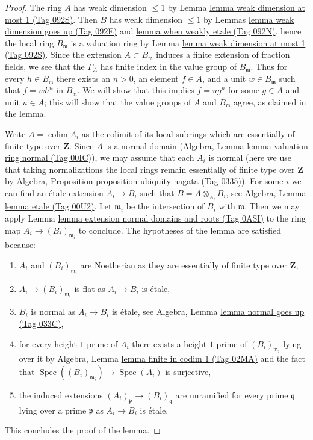 \documentclass{amsart}
\theoremstyle{plain}
\theoremstyle{definition}
\theoremstyle{remark}
\numberwithin{equation}{subsection}
\def\colim{\mathop{\mathrm{colim}}\nolimits}
\def\Spec{\mathop{\mathrm{Spec}}}
\begin{document}
\begin{proof}
The ring $A$ has weak dimension $\leq 1$ by
Lemma \href{https://stacks.math.columbia.edu/tag/092S}{lemma weak dimension at most 1 (Tag 092S)}. Then $B$ has weak dimension
$\leq 1$ by Lemmas \href{https://stacks.math.columbia.edu/tag/092E}{lemma weak dimension goes up (Tag 092E)} and
\href{https://stacks.math.columbia.edu/tag/092N}{lemma when weakly etale (Tag 092N)}. hence the local ring $B_\mathfrak m$
is a valuation ring by Lemma \href{https://stacks.math.columbia.edu/tag/092S}{lemma weak dimension at most 1 (Tag 092S)}.
Since the extension $A \subset B_\mathfrak m$ induces a finite
extension of fraction fields,
we see that the $\Gamma_A$ has finite index in the value group of
$B_{\mathfrak m}$. Thus for every $h \in B_\mathfrak m$ there exists
an $n > 0$, an element $f \in A$, and a unit $w \in B_\mathfrak m$
such that $f = w h^n$ in $B_\mathfrak m$. We will show that this implies
$f = ug^n$ for some $g \in A$ and unit $u \in A$; this will show that
the value groups of $A$ and $B_\mathfrak m$ agree, as claimed in the lemma.

\medskip\noindent
Write $A = \colim A_i$ as the colimit of its local subrings which
are essentially of finite type over $\mathbf{Z}$. Since $A$
is a normal domain (Algebra, Lemma \href{https://stacks.math.columbia.edu/tag/00IC}{lemma valuation ring normal (Tag 00IC)}),
we may assume that each $A_i$ is normal (here we use that taking
normalizations the local rings remain essentially of finite type
over $\mathbf{Z}$ by
Algebra, Proposition \href{https://stacks.math.columbia.edu/tag/0335}{proposition ubiquity nagata (Tag 0335)}).
For some $i$ we can find an \'etale extension $A_i \to B_i$
such that $B = A \otimes_{A_i} B_i$, see
Algebra, Lemma \href{https://stacks.math.columbia.edu/tag/00U2}{lemma etale (Tag 00U2)}.
Let $\mathfrak m_i$ be the intersection of $B_i$ with $\mathfrak m$.
Then we may apply Lemma \href{https://stacks.math.columbia.edu/tag/0ASI}{lemma extension normal domains and roots (Tag 0ASI)}
to the ring map $A_i \to (B_i)_{\mathfrak m_i}$ to conclude.
The hypotheses of the lemma are satisfied because:
\begin{enumerate}
\item $A_i$ and $(B_i)_{\mathfrak m_i}$ are Noetherian as they are
essentially of finite type over $\mathbf{Z}$,
\item $A_i \to (B_i)_{\mathfrak m_i}$ is flat as $A_i \to B_i$ is \'etale,
\item $B_i$ is normal as $A_i \to B_i$ is \'etale, see
Algebra, Lemma \href{https://stacks.math.columbia.edu/tag/033C}{lemma normal goes up (Tag 033C)},
\item for every height $1$ prime of $A_i$ there exists a height $1$
prime of $(B_i)_{\mathfrak m_i}$ lying over it by
Algebra, Lemma \href{https://stacks.math.columbia.edu/tag/02MA}{lemma finite in codim 1 (Tag 02MA)} and the fact that
$\Spec((B_i)_{\mathfrak m_i}) \to \Spec(A_i)$ is surjective,
\item the induced extensions $(A_i)_\mathfrak p \to (B_i)_\mathfrak q$
are unramified for every prime $\mathfrak q$ lying over a prime
$\mathfrak p$ as $A_i \to B_i$ is \'etale.
\end{enumerate}
This concludes the proof of the lemma.
\end{proof}
\end{document}
